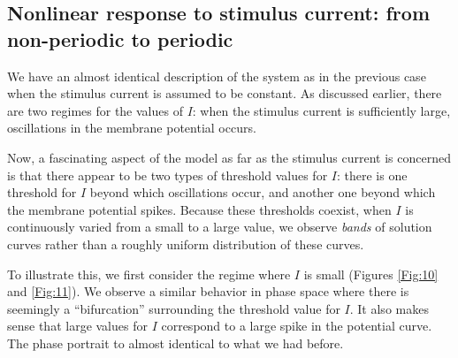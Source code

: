 \documentclass{book}
\theoremstyle{definition}
\begin{document}
\subsection{Nonlinear response to stimulus current: from non-periodic to periodic}


We have an almost identical description of the system as in the previous case when the stimulus current is assumed to be constant. As discussed earlier, there are two regimes for the values of $I$: when the stimulus current is sufficiently large, oscillations in the membrane potential occurs. 

Now, a fascinating aspect of the model as far as the stimulus current is concerned is that there appear to be two types of threshold values for $I$: there is one threshold for $I$ beyond which oscillations occur, and another one beyond which the membrane potential spikes. Because these thresholds coexist, when $I$ is continuously varied from a small to a large value, we observe \textit{bands} of solution curves rather than a roughly uniform distribution of these curves.

To illustrate this, we first consider the regime where $I$ is small (Figures \ref{Fig:10} and \ref{Fig:11}). We observe a similar behavior in phase space where there is seemingly a ``bifurcation'' surrounding the threshold value for $I$. It also makes sense that large values for $I$ correspond to a large spike in the potential curve. The phase portrait to almost identical to what we had before.   
\end{document}
